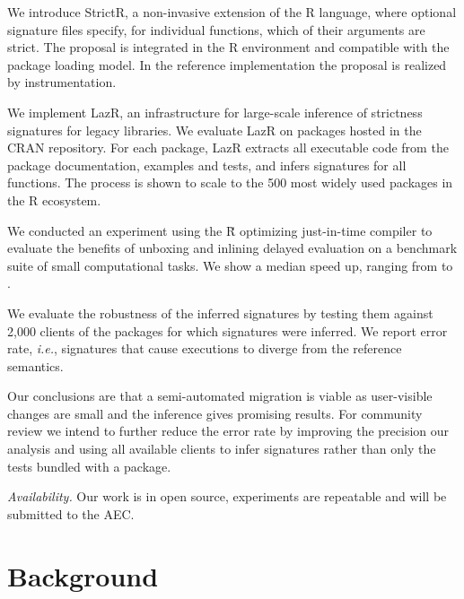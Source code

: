 \documentclass[review,nonacm,screen,acmsmall,anonymous=true]{acmart}
\newcommand{\strictr}{{\sf StrictR}\xspace}
\newcommand{\lazr}{{\sf LazR}\xspace}
\renewcommand{\Rsh}{{\sf\u R}\xspace}
\newcommand{\ie}{\emph{i.e.},\xspace}
\begin{document}
\begin{compactitem}[---]
\item We introduce \strictr, a non-invasive extension of the R language, where
  optional signature files specify, for individual functions, which of their
  arguments are strict. The proposal is integrated in the R environment and
  compatible with the package loading model. In the reference implementation the
  proposal is realized by instrumentation.
\item We implement \lazr, an infrastructure for large-scale inference of
  strictness signatures for legacy libraries. We evaluate \lazr on packages
  hosted in the CRAN repository. For each package, \lazr extracts all executable
  code from the package documentation, examples and tests, and infers signatures
  for all functions. The process is shown to scale to the 500 most widely used
  packages in the R ecosystem.
\item We conducted an experiment using the \Rsh optimizing just-in-time compiler
  to evaluate the benefits of unboxing and inlining delayed evaluation on a
  benchmark suite of small computational tasks. We show a median
  \speedupRshStrict speed up, ranging from \speedupRshStrictMin to
  \speedupRshStrictMax.
\item We evaluate the robustness of the inferred signatures by testing them
  against 2,000 clients of the packages for which signatures were inferred. We
  report \robustnesResult error rate, \ie signatures that cause executions to
  diverge from the reference semantics.

\end{compactitem}

\medskip

\noindent Our conclusions are that a semi-automated migration is viable as
user-visible changes are small and the inference gives promising results. For
community review we intend to further reduce the error rate by improving the
precision our analysis and using all available clients to infer signatures
rather than only the tests bundled with a package.

{\small \medskip\noindent\emph{Availability.} Our work is in open source, experiments are
repeatable and will be submitted to the AEC.}

\newpage
\section{Background}\label{sec:background}
\end{document}
